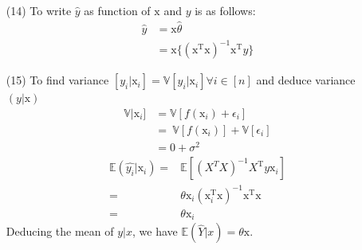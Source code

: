 \documentclass[12pt,a4paper]{article}
\begin{document}
\begin{enumerate}
		\item[(14)] To write  $\hat{y}$ as  function of $\mathrm{x}$ and $y$ is as follows:
				\begin{align*}
						\hat{y} &=  \mathrm{x} \hat{\theta} \\
									&=  \mathrm{x}\lbrace (\mathrm{x}^{\text{T} } \mathrm{x})^{-1} \mathrm{x}^{\text{T} } y   \rbrace 
				\end{align*}
		\item[(15)]  To find variance $[y_i|\mathrm{x}_i] = \mathbb{V}[y_i|\mathrm{x}_i] \forall i  \in [n]$ and deduce variance$(y|\mathrm{x})$
		 	\begin{align*}
		 		\mathbb{V}|\mathrm{x}_i]  &=  \mathbb{V}[ f(\mathrm{x}_i)  +  \epsilon_i] \\
		 						&=  \ \mathbb{V}[ f(\mathrm{x}_i) ]  +  \mathbb{V}[ \epsilon_i] \\
		 						&=  0  + \sigma^2
		 	\end{align*}
               \begin{align*}
               \mathbb{E}(\hat{y_i}|\mathrm{x}_i)= &\mathbb{E}[(X^TX)^{-1}X^{\text{T}} y \mathrm{x}_i]\\
               =&\theta \mathrm{x}_i (\mathrm{x}_i^{\text{T}} \mathrm{x})^{-1}\mathrm{x}^{\text{T}}\mathrm{x}\\
               =&\theta \mathrm{x}_i
           \end{align*}
              Deducing the mean of $y|x$, we have $\mathbb{E}(\hat{Y}|x)=\theta \mathrm{x}$.
              

\end{enumerate}
\end{document}
